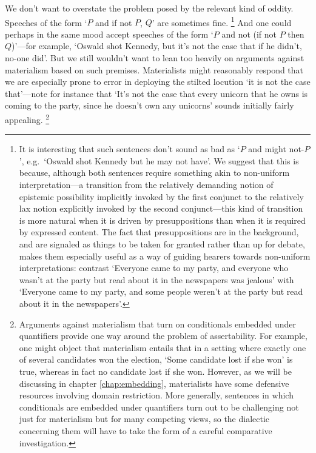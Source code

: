 \documentclass[If.tex]{subfiles}
\begin{document}
We don't want to overstate the problem posed by the relevant kind of oddity.  Speeches of the form ‘$P$ and if not $P$, $Q$’ are sometimes fine.%
\footnote{It is interesting that such sentences don't sound as bad as ‘$P$ and might not-$P$’, e.g.\ ‘Oswald shot Kennedy but he may not have’.  We suggest that this is because, although both sentences require something akin to non-uniform interpretation---a transition from the relatively demanding notion of epistemic possibility implicitly invoked by the first conjunct to the relatively lax notion explicitly invoked by the second conjunct---this kind of transition is more natural when it is driven by presuppositions than when it is required by expressed content.  The fact that presuppositions are in the background, and are signaled as things to be taken for granted rather than up for debate, makes them especially useful as a way of guiding hearers towards non-uniform interpretations: contrast ‘Everyone came to my party, and everyone who wasn't at the party but read about it in the newspapers was jealous’ with ‘Everyone came to my party, and some people weren't at the party but read about it in the newspapers’.} %
And one could perhaps in the same mood accept speeches of the form ‘$P$ and not (if not $P$ then $Q$)’---for example, ‘Oswald shot Kennedy, but it's not the case that if he didn't, no-one did’.
But we still wouldn't want to lean too heavily on arguments against materialism based on such premises.  Materialists might reasonably respond that we are especially prone to error in deploying the stilted locution ‘it is not the case that’---note for instance that ‘It's not the case that every unicorn that he owns is coming to the party, since he doesn't own any unicorns’ sounds initially fairly appealing.%
\footnote{Arguments against materialism that turn on conditionals embedded under quantifiers provide one way around the problem of assertability.  For example, one might object that materialism entails that in a setting where exactly one of several candidates won the election, ‘Some candidate lost if she won’ is true, whereas in fact no candidate lost if she won.  However, as we will be discussing in chapter \autoref{chap:embedding}, materialists have some defensive resources involving domain restriction.  More generally, sentences in which conditionals are embedded under quantifiers turn out to be challenging not just for materialism but for many competing views, so the dialectic concerning them will have to take the form of a careful comparative investigation.}  
\end{document}
